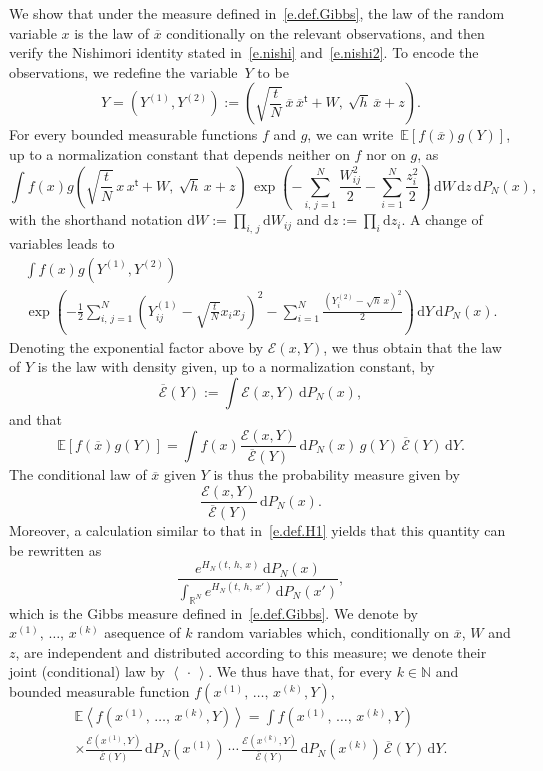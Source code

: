 \documentclass[10pt]{amsart}
\theoremstyle{definition}\newtheorem{defi}[theo]{Definition}\newtheorem{rema}[theo]{Remark}\newtheorem{exam}[theo]{Example}\newtheorem{exem}[theo]{Example}\newtheorem{nota}[theo]{Notation}
\newcommand{\N}{\mathbb{N}}
\newcommand{\R}{\mathbb{R}}
\newcommand{\E}{\mathbb{E}}
\renewcommand{\d}{\mathrm{d}}
\renewcommand{\t}{\mathsf{t}}
\newcommand{\1}{\mathds{1}}
\newcommand{\mclE}{\mathcal{E}}
\newcommand{\la}{\left\langle}
\newcommand{\ra}{\right\rangle}
\renewcommand{\bar}{\overline}
\begin{document}
We show that under the measure defined in~\eqref{e.def.Gibbs}, the law of the random variable $x$ is the law of $\bar x$ conditionally on the relevant observations, and then verify the Nishimori identity stated in~\eqref{e.nishi} and~\eqref{e.nishi2}. To encode the observations, we redefine the variable~$Y$ to be
\[
Y = \left(Y^{(1)},Y^{(2)}\right) := \left(\sqrt{\frac{t}{N}} \, \bar x \, \bar x^\t + W, \ \sqrt{h} \, \bar x + z\right).
\]
For every bounded measurable functions $f$ and $g$, we can write~$\E \left[f(\bar x) g(Y) \right]$, up to a normalization constant that depends neither on $f$ nor on $g$, as
\[
\int f(x) g \left(\sqrt{\frac{t}{N}} \, x \, x^\t + W, \ \sqrt{h} \, x + z \right) \, \exp \left(- \sum_{i,\,j = 1}^N \frac{W_{ij}^2}2 - \sum_{i = 1}^N \frac{z_i^2}{2} \right) \, \d W \, \d z \, \d P_N(x),
\]with the shorthand notation $\d W := \prod_{i,\,j} \d W_{ij}$ and $\d z := \prod_i \d z_i$. A change of variables leads to
\begin{multline*}
\int f(x) g(Y^{(1)},Y^{(2)}) \\
\exp \left(-\frac 1 2 \sum_{i,\,j = 1}^N \left(Y^{(1)}_{ij} - \sqrt{\frac t N} x_i x_j \right)^2 - \sum_{i= 1}^N \frac{(Y^{(2)}_i - \sqrt{h} \, x)^2}{2} \right) \, \d Y \, \d P_N(x).
\end{multline*}
Denoting the exponential factor above by $\mclE(x,Y)$, we thus obtain that the law of $Y$ is the law with density given, up to a normalization constant, by
\[
\bar {\mclE}(Y) := \int \mclE(x,Y) \, \d P_N(x),
\]
and that
\begin{equation}\label{e.joint.law}
\E \left[f(\bar x) g(Y) \right] = \int f(x) \frac{\mclE(x,Y)}{\bar {\mclE}(Y)} \, \d P_N(x) \, g(Y) \, \bar {\mclE}(Y) \, \d Y.
\end{equation}
The conditional law of $\bar x$ given $Y$ is thus the probability measure given by
\[
\frac{\mclE(x,Y)}{\bar{\mclE}(Y)} \, \d P_N(x).
\]
Moreover, a calculation similar to that in~\eqref{e.def.H1} yields that this quantity can be rewritten as
\[
\frac{e^{H_N(t,\,h,\,x)} \, \d P_N(x)}{\int_{\R^N} e^{H_N(t,\,h,\,x')} \, \d P_N(x')},
\]
which is the Gibbs measure defined in~\eqref{e.def.Gibbs}. We denote by $x^{(1)},\,\ldots,\,x^{(k)}$ a\linebreak sequence of $k$ random variables which, conditionally on $\bar x$, $W$ and $z$, are independent and distributed according to this measure; we denote their joint (conditional) law by $\la\,\cdot\,\ra$. We thus have that, for every $k \in \N$ and bounded measurable function $f (x^{(1)},\,\ldots,\,x^{(k)},Y)$,
\begin{multline*}
\E \la f\left(x^{(1)},\,\ldots,\,x^{(k)},Y\right) \ra =
\int f\left(x^{(1)},\,\ldots,\,x^{(k)},Y\right) \\
\times \frac{\mclE\left(x^{(1)},Y\right)}{\bar{\mclE}(Y)} \, \d P_N\left(x^{(1)}\right) \, \cdots \,\frac{\mclE\left(x^{(k)},Y\right)}{\bar{\mclE}(Y)} \, \d P_N\left(x^{(k)}\right) \, \bar{\mclE}(Y) \, \d Y.
\end{multline*}
\end{document}
